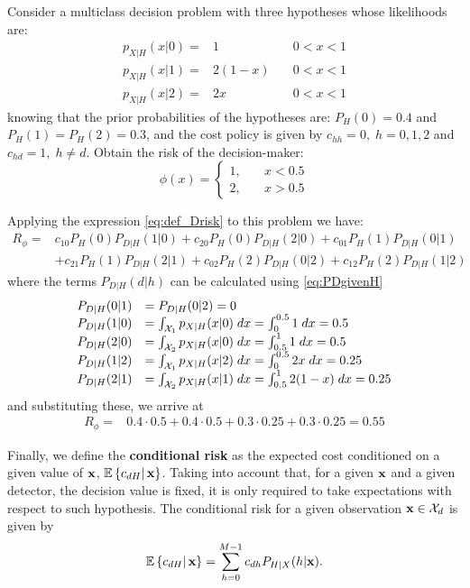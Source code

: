 \begin{example} \label{ex_dec1}
Consider a multiclass decision problem with three hypotheses whose likelihoods are:
$$\begin{array}{lll}
p_{X|H}(x|0)= & 1 &  \quad 0<x<1 \\ 
p_{X|H}(x|1)= & 2(1-x)  &  \quad 0<x<1 \\ 
p_{X|H}(x|2)= & 2x & \quad 0<x<1 
\end{array} $$
knowing that the prior probabilities of the hypotheses are: $P_H(0)=0.4$ and $P_H(1)=P_H(2)=0.3$, and the cost policy is given by $c_{hh}=0, \; h=0,1,2$ and $c_{hd}=1, \; h \neq d$. Obtain the risk of the decision-maker:
$$ \phi (x) = \left\lbrace  \begin{array}{ll}    
1, & \quad x<0.5 \\
2, & \quad x>0.5 
\end{array} 
\right. $$

Applying the expression \eqref{eq:def_Drisk} to this problem we have:
$$\begin{array}{rl}
R_\phi = &  c_{10} P_H(0) P_{D|H}(1|0) + c_{20} P_H(0) P_{D|H}(2|0) + c_{01} P_H(1) P_{D|H}(0|1) \\
& +  c_{21} P_H(1) P_{D|H}(2|1) +  c_{02} P_H(2) P_{D|H}(0|2) +   c_{12} P_H(2) P_{D|H}(1|2) 
\end{array} $$
where the terms $P_{D|H}(d|h)$ can be calculated using \eqref{eq:PDgivenH}
$$\begin{array}{ll}
P_{D|H}(0|1) &=P_{D|H}(0|2)= 0  \\
P_{D|H}(1|0) &= \int_{{\cal X}_1} p_{{X}|H}({x}|0) \;d{x} = \int_{0}^{0.5} 1 \;d{x} = 0.5 \\ 
P_{D|H}(2|0) &= \int_{{\cal X}_2} p_{{X}|H}({x}|0)\; d{x} = \int_{0.5}^{1} 1 \;d{x} = 0.5 \\
P_{D|H}(1|2) &=\int_{{\cal X}_1} p_{{X}|H}({x}|2) \;d{x} = \int_{0}^{0.5} 2x \;d{x} = 0.25 \\
P_{D|H}(2|1) &=\int_{{\cal X}_2} p_{{X}|H}({x}|1) \;d{x} = \int_{0.5}^{1} 2(1-x) \;d{x} = 0.25 
\end{array} $$
and substituting these, we arrive at
$$\begin{array}{rl}
R_\phi = &  0.4 \cdot 0.5  + 0.4 \cdot 0.5 + 0.3 \cdot 0.25 + 0.3 \cdot 0.25 = 0.55
\end{array} $$
\end{example}
\vspace{0.2cm}

Finally, we define the \textbf{conditional risk} as the expected cost conditioned on a given value of ${\bf x}$, $\mathbb{E}\left\{c_{dH}\right|{\bf x}\}$. Taking into account that, for a given ${\bf x}$ and a given detector, the decision value is fixed, it is only required to take expectations with respect to such hypothesis. The conditional risk for a given observation ${\bf x} \in {\cal X}_d$ is given by
\begin{equation}
\mathbb{E}\left\{ c_{dH}\right|{\bf x}\} = \sum_{h=0}^{M-1} c_{dh} P_{H|X}(h|{\bf x}).
\label{eq:cost_x}
\end{equation}

